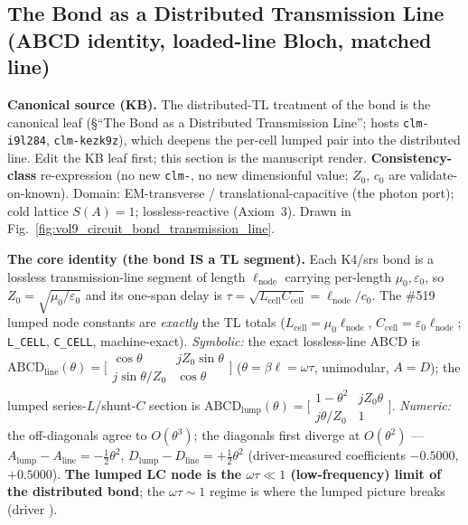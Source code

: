 \subsection{The Bond as a Distributed Transmission Line (ABCD identity, loaded-line Bloch, matched line)}
\label{sec:vol9_bond_transmission_line}

\noindent\textbf{Canonical source (KB).} The distributed-TL treatment of the bond is the canonical leaf  (\S``The Bond as a Distributed Transmission Line''; hosts \texttt{clm-i9l284}, \texttt{clm-kezk9z}), which deepens the per-cell lumped pair into the distributed line. Edit the KB leaf first; this section is the manuscript render. \textbf{Consistency-class} re-expression (no new \texttt{clm-}, no new dimensionful value; $Z_0$, $c_0$ are validate-on-known). Domain: EM-transverse / translational-capacitive (the photon port); cold lattice $S(A)=1$; lossless-reactive (Axiom~3). Drawn in Fig.~\ref{fig:vol9_circuit_bond_transmission_line}.



\medskip\noindent\textbf{The core identity (the bond IS a TL segment).} Each K4/srs bond is a lossless transmission-line segment of length $\ell_{\mathrm{node}}$ carrying per-length $\mu_0,\varepsilon_0$, so $Z_0=\sqrt{\mu_0/\varepsilon_0}$ and its one-span delay is $\tau=\sqrt{L_{\mathrm{cell}}C_{\mathrm{cell}}}=\ell_{\mathrm{node}}/c_0$. The \#519 lumped node constants are \emph{exactly} the TL totals ($L_{\mathrm{cell}}=\mu_0\ell_{\mathrm{node}}$, $C_{\mathrm{cell}}=\varepsilon_0\ell_{\mathrm{node}}$;  \texttt{L\_CELL}, \texttt{C\_CELL}, machine-exact). \emph{Symbolic:} the exact lossless-line ABCD is $\mathrm{ABCD}_{\mathrm{line}}(\theta)=\bigl[\begin{smallmatrix}\cos\theta & jZ_0\sin\theta\\ j\sin\theta/Z_0 & \cos\theta\end{smallmatrix}\bigr]$ ($\theta=\beta\ell=\omega\tau$, unimodular, $A=D$); the lumped series-$L$/shunt-$C$ section is $\mathrm{ABCD}_{\mathrm{lump}}(\theta)=\bigl[\begin{smallmatrix}1-\theta^2 & jZ_0\theta\\ j\theta/Z_0 & 1\end{smallmatrix}\bigr]$. \emph{Numeric:} the off-diagonals agree to $O(\theta^3)$; the diagonals first diverge at $O(\theta^2)$ --- $A_{\mathrm{lump}}-A_{\mathrm{line}}=-\tfrac12\theta^2$, $D_{\mathrm{lump}}-D_{\mathrm{line}}=+\tfrac12\theta^2$ (driver-measured coefficients $-0.5000$, $+0.5000$). \textbf{The lumped LC node is the $\omega\tau\ll1$ (low-frequency) limit of the distributed bond}; the $\omega\tau\sim1$ regime is where the lumped picture breaks (driver \texttt{}).


